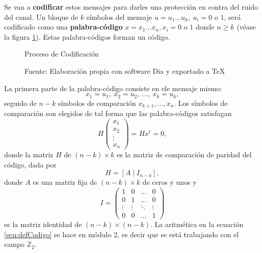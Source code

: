 Se van a \textbf{codificar} estos mensajes para darles una protección en contra del ruido del canal. Un bloque de $k$ símbolos del mensaje $u = u_1\dots u_k,\ u_i = 0 \mbox{ o } 1$, será codificado como una \textbf{palabra-código} $x = x_1 \dots x_n, x_i = 0 \mbox{ o } 1$ donde $n \geq k$ (véase la figura \ref{fig:codificacion}). Estas palabra-códigos forman un código.
\begin{figure}
\caption{Proceso de Codificación}
\centering

\caption*{Fuente: Elaboración propia con software Dia y exportado a \TeX}
\label{fig:codificacion}
\end{figure}
La primera parte de la palabra-código consiste en ele mensaje mismo: \[ x_1 = u_1,\ x_2 = u_2,\ \dots ,\ x_k = u_k, \] seguido de $n-k$ símbolos de comparación $x_{k+1}, \dots , x_n$. 
Los símbolos de comparación son elegidos de tal forma que las palabra-códigos satisfagan 
\[ H \begin{pmatrix}
x_1 \\ 
x_2 \\
\vdots \\
x_n
\end{pmatrix} = Hx^{t} = 0, \] donde la matriz $H$ de $(n-k)\times k$ es la matriz de comparación de paridad del código, dada por 
\begin{equation}\label{ecu:defCodigo}
H = [A \mid I_{n-k}],
\end{equation}  
donde $A$ es una matriz fija de $(n-k)\times k$ de ceros y unos y \[ I = \begin{pmatrix}
1 & 0 & \dots & 0 \\
0 & 1 & \dots & 0 \\
\vdots & \vdots & \ddots & \vdots \\
0 & 0 & \dots & 1
\end{pmatrix} \] es la matriz identidad de $(n-k) \times (n-k)$. La aritmética en la ecuación \ref{ecu:defCodigo} se hace en módulo 2, es decir que se está trabajando con el campo $\mathds{Z}_2$. 
